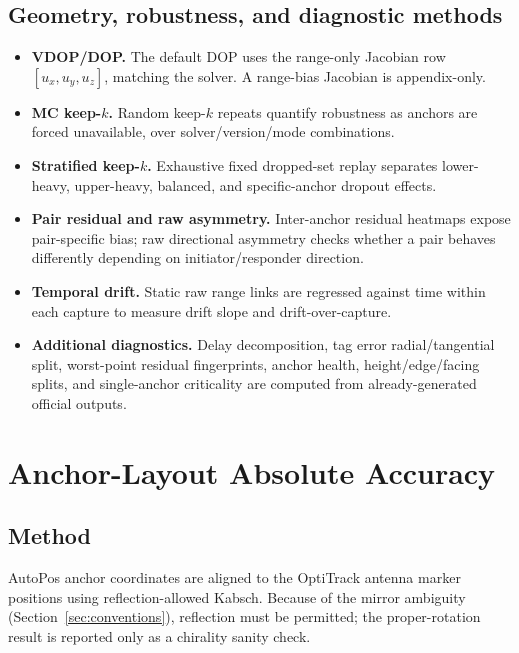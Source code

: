 \documentclass[11pt,a4paper]{article}
\begin{document}
\subsection{Geometry, robustness, and diagnostic methods}
\begin{itemize}[leftmargin=1.4em]
  \item \textbf{VDOP/DOP.} The default DOP uses the range-only Jacobian row
        $[u_x,u_y,u_z]$, matching the solver. A range-bias Jacobian is appendix-only.
  \item \textbf{MC keep-$k$.} Random keep-$k$ repeats quantify robustness as anchors are
        forced unavailable, over solver/version/mode combinations.
  \item \textbf{Stratified keep-$k$.} Exhaustive fixed dropped-set replay separates
        lower-heavy, upper-heavy, balanced, and specific-anchor dropout effects.
  \item \textbf{Pair residual and raw asymmetry.} Inter-anchor residual heatmaps expose
        pair-specific bias; raw directional asymmetry checks whether a pair behaves
        differently depending on initiator/responder direction.
  \item \textbf{Temporal drift.} Static raw range links are regressed against time within
        each capture to measure drift slope and drift-over-capture.
  \item \textbf{Additional diagnostics.} Delay decomposition, tag error radial/tangential
        split, worst-point residual fingerprints, anchor health, height/edge/facing splits,
        and single-anchor criticality are computed from already-generated official outputs.
\end{itemize}

\section{Anchor-Layout Absolute Accuracy}
\label{sec:layout}

\subsection{Method}
AutoPos anchor coordinates are aligned to the OptiTrack antenna marker positions using
reflection-allowed Kabsch. Because of the mirror ambiguity (Section~\ref{sec:conventions}),
reflection must be permitted; the proper-rotation result is reported only as a chirality
sanity check.
\end{document}
